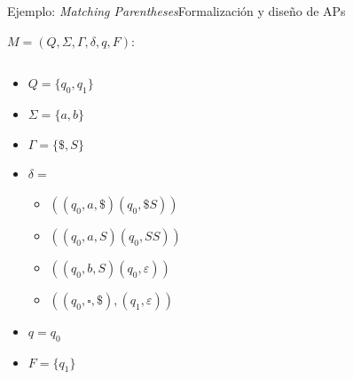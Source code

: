 \documentclass[spanish, handout]{beamer}
\begin{document}
\begin{frame}{Ejemplo: \textit{Matching Parentheses}}{Formalización y diseño de APs}

    $M = (Q, \Sigma, \Gamma, \delta, q, F)$:

    \begin{columns}
        \begin{column}{0.4\textwidth}
            \begin{itemize}
                \item $Q = \{q_0, q_1\}$
                \item $\Sigma = \{a,b\}$
                \item $\Gamma = \{\$, S\}$
                \item $\delta =$
                \begin{itemize}
                    \item $((q_0,a,\$)(q_0,\$S))$
                    \item $((q_0,a,S)(q_0,SS))$
                    \item $((q_0,b,S)(q_0,\varepsilon))$
                    \item $((q_0,\square,\$),(q_1,\varepsilon))$
                \end{itemize}
                \item $q = q_0$
                \item $F = \{q_1\}$
            \end{itemize}
        \end{column}
        \begin{column}{0.6\textwidth}
        \end{column}
    \end{columns}
    
\end{frame}
\end{document}
